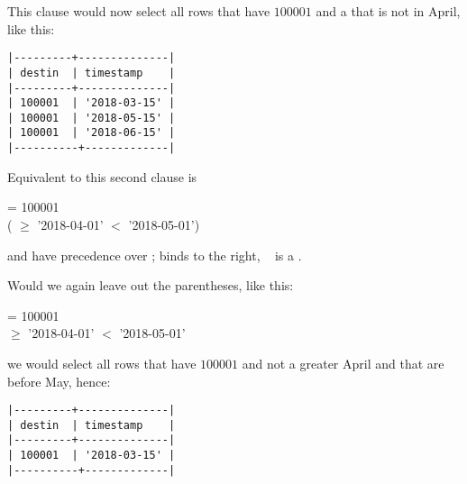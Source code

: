 This clause would now select all rows
that have  $100001$ and
a  that is not in April,
like this:

\begin{minipage}{\textwidth}
\begin{verbatim}
|---------+--------------|
| destin  | timestamp    |
|---------+--------------|
| 100001  | '2018-03-15' |
| 100001  | '2018-05-15' |
| 100001  | '2018-06-15' |
|----------+-------------|
\end{verbatim}
\end{minipage}

Equivalent to this second clause is

  = 100001 \\
\hspace*{0.45cm}  
( $\ge$ '2018-04-01'
  $<$ '2018-05-01')

 and  have precedence
over ;  binds to the right,
\ie\  is a .

Would we again leave out the parentheses,
like this:

  = 100001 \\
\hspace*{0.45cm}  
 $\ge$ '2018-04-01'
  $<$ '2018-05-01'

we would select all rows that have 
$100001$ and not a  greater April
and that are before May, hence:

\begin{minipage}{\textwidth}
\begin{verbatim}
|---------+--------------|
| destin  | timestamp    |
|---------+--------------|
| 100001  | '2018-03-15' |
|----------+-------------|
\end{verbatim}
\end{minipage}

